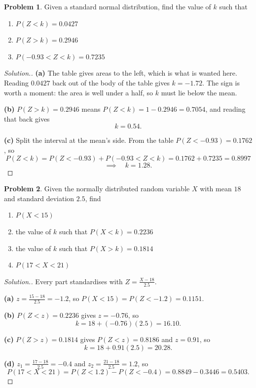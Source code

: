 \documentclass[11pt,a4paper]{article}
\theoremstyle{definition}
\newtheorem{problemx}{Problem}[section]
\newenvironment{problem}{\begin{problemx}}{\end{problemx}}
\newenvironment{solution}
  {\renewcommand{\qedsymbol}{}\begin{proof}[\textit{Solution}.]}
  {\end{proof}}
\begin{document}
\begin{problem}
Given a standard normal distribution, find the value of $k$ such that
\begin{enumerate}
\item[(a).] $P(Z<k)=0.0427$
\item[(b).] $P(Z>k)=0.2946$
\item[(c).] $P(-0.93<Z<k)=0.7235$
\end{enumerate}
\end{problem}

\begin{solution}
\textbf{(a)} The table gives areas to the left, which is what is wanted here. Reading
$0.0427$ back out of the body of the table gives $k=-1.72$. The sign is worth a moment: the
area is well under a half, so $k$ must lie below the mean.

\textbf{(b)} $P(Z>k)=0.2946$ means $P(Z<k)=1-0.2946=0.7054$, and reading that back gives
\[k=0.54.\]

\textbf{(c)} Split the interval at the mean's side. From the table $P(Z<-0.93)=0.1762$, so
\[P(Z<k)=P(Z<-0.93)+P(-0.93<Z<k)=0.1762+0.7235=0.8997\]
\[\implies\quad k=1.28.\]
\end{solution}

\begin{problem}
Given the normally distributed random variable $X$ with mean $18$ and standard deviation
$2.5$, find
\begin{enumerate}
\item[(a).] $P(X<15)$
\item[(b).] the value of $k$ such that $P(X<k)=0.2236$
\item[(c).] the value of $k$ such that $P(X>k)=0.1814$
\item[(d).] $P(17<X<21)$
\end{enumerate}
\end{problem}

\begin{solution}
Every part standardises with $Z=\frac{X-18}{2.5}$.

\textbf{(a)} $z=\frac{15-18}{2.5}=-1.2$, so $P(X<15)=P(Z<-1.2)=0.1151$.

\textbf{(b)} $P(Z<z)=0.2236$ gives $z=-0.76$, so
\[k=18+(-0.76)(2.5)=16.10.\]

\textbf{(c)} $P(Z>z)=0.1814$ gives $P(Z<z)=0.8186$ and $z=0.91$, so
\[k=18+0.91(2.5)=20.28.\]

\textbf{(d)} $z_1=\frac{17-18}{2.5}=-0.4$ and $z_2=\frac{21-18}{2.5}=1.2$, so
\[P(17<X<21)=P(Z<1.2)-P(Z<-0.4)=0.8849-0.3446=0.5403.\]
\end{solution}
\end{document}
